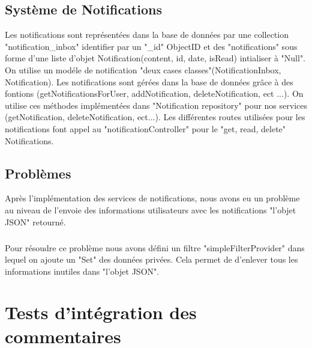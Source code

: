 \subsection{Système de Notifications}
Les notifications sont représentées dans la base de données par une collection "notification\_inbox" identifier par un "\_id" ObjectID et des "notifications" sous forme d'une liste d'objet Notification(content, id, date, isRead) intialiser à "Null".
On utilise un modéle de notification "deux cases classes"(NotificationInbox, Notification).
Les notifications sont gérées dans la base de données grâce à des fontions (getNotificationsForUser, addNotification, deleteNotification, ect ...).
On utilise ces méthodes implémentées dans "Notification repository" pour nos services (getNotification, deleteNotification, ect...).
Les différentes routes utilisées pour les notifications font appel au "notificationController" pour le "get, read, delete" Notifications.
\subsection{Problèmes}
Après l'implémentation des services de notifications, nous avons eu un problème au niveau de l'envoie des informations utilisateurs avec les notifications "l'objet JSON" retourné.
\subparagraph{}
Pour résoudre ce problème nous avons défini un filtre "simpleFilterProvider" dans lequel on ajoute un "Set" des données privées. Cela permet de d'enlever tous les informations inutiles dans "l'objet JSON".


\section{Tests d'intégration des commentaires}
